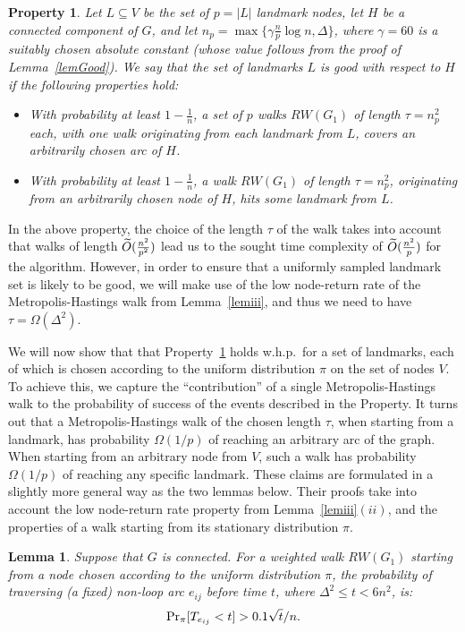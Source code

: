 \documentclass[11pt,a4paper]{article}
\newtheorem{lemma}{Lemma}
\newtheorem{property}{Property}
\renewcommand{\O}{\ensuremath \widetilde O}
\renewcommand{\Pr}{\ensuremath \mathrm {Pr}}
\renewcommand{\*}{\hspace*{5mm}}
\begin{document}
\begin{property}\label{begood}
Let $L \subseteq V$ be the set of $p = |L|$ landmark nodes, let $H$ be a connected component of $G$, and let $n_p = \max\{\gamma \frac{n}{p} \log n, \Delta\}$, where $\gamma =60$ is a suitably chosen absolute constant (whose value follows from the proof of Lemma~\ref{lemGood}). We say that the set of landmarks $L$ is \emph{good with respect to $H$} if the following properties hold:
\begin{itemize}
\item With probability at least $1 - \frac{1}{n}$, a set of $p$ walks $RW(G_1)$ of length $\tau = n_p^2$ each, with one walk originating from each landmark from $L$, covers an arbitrarily chosen arc of $H$.
\item With probability at least $1 - \frac{1}{n}$, a walk $RW(G_1)$ of length $\tau = n_p^2$, originating from an arbitrarily chosen node of $H$, hits some landmark from $L$.
\end{itemize}
\end{property}

In the above property, the choice of the length $\tau$ of the walk takes into account that walks of length $\O(\frac{n^2}{p^2})$ lead us to the sought time complexity of $\O(\frac{n^2}{p})$ for the algorithm. However, in order to ensure that a uniformly sampled landmark set is likely to be good, we will make use of the low node-return rate of the Metropolis-Hastings walk from Lemma~\ref{lemiii}, and thus we need to have $\tau = \Omega(\Delta^2)$.

We will now show that that Property~\ref{begood} holds w.h.p.\ for a set of landmarks, each of which is chosen according to the uniform distribution $\pi$ on the set of nodes $V$. To achieve this, we capture the ``contribution'' of a single Metropolis-Hastings walk to the probability of success of the events described in the Property. It turns out that a Metropolis-Hastings walk  of the chosen length $\tau$, when starting from a landmark, has probability $\Omega(1/p)$ of reaching an arbitrary arc of the graph. When starting from an arbitrary node from $V$, such a walk has probability $\Omega(1/p)$ of reaching any specific landmark. These claims are formulated in a slightly more general way as the two lemmas below. Their proofs take into account the low node-return rate property from Lemma~\ref{lemiii}$(ii)$, and the properties of a walk starting from its stationary distribution $\pi$.

\begin{lemma}\label{lemA}
Suppose that $G$ is connected. For a weighted walk $RW(G_1)$ starting from a node chosen according to the uniform distribution $\pi$, the probability of traversing (a fixed) non-loop arc $e_{ij}$ before time $t$, where $\Delta^2 \leq t < 6n^2$, is:
$$
\Pr_{\pi} [T_{e_{ij}} < t ] > 0.1 \sqrt t / n.
$$
\end{lemma}
\end{document}
